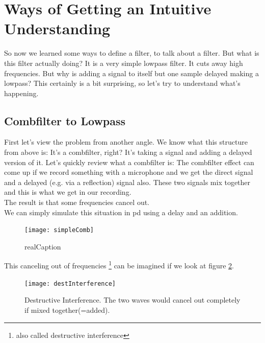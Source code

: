     


\section{Ways of Getting an Intuitive Understanding}

So now we learned some ways to define a filter, to talk about a filter. But what is this filter actually doing? It is a very simple lowpass filter. It cuts away high frequencies. But why is adding a signal to itself but one sample delayed making a lowpass? This certainly is a bit surprising, so let's try to understand what's happening.

\subsection{Combfilter to Lowpass}
First let's view the problem from another angle. We know what this structure from above is: It's a combfilter, right? It's taking a signal and adding a delayed version of it. Let's quickly review what a combfilter is:
The combfilter effect can come up if we record something with a microphone and we get the direct signal and a delayed (e.g. via a reflection) signal also. These two signals mix together and this is what we get in our recording.\\
The result is that some frequencies cancel out.\\
We can simply simulate this situation in pd using a delay and an addition. 

\begin{figure}[H]
	\centering
	\texttt{[image: simpleComb]}
	\caption[shortCaption]
	{realCaption}
	\label{fig:label}
\end{figure}

This canceling out of frequencies \footnote{also called destructive interference} can be imagined if we look at figure \ref{fig:destIntereference}. 
\begin{figure}[H]
	\centering
	\texttt{[image: destInterference]}
	\caption[Destructive Interference]
	{Destructive Interference. The two waves would cancel out completely if mixed together(=added).}
	\label{fig:destIntereference}
\end{figure}

